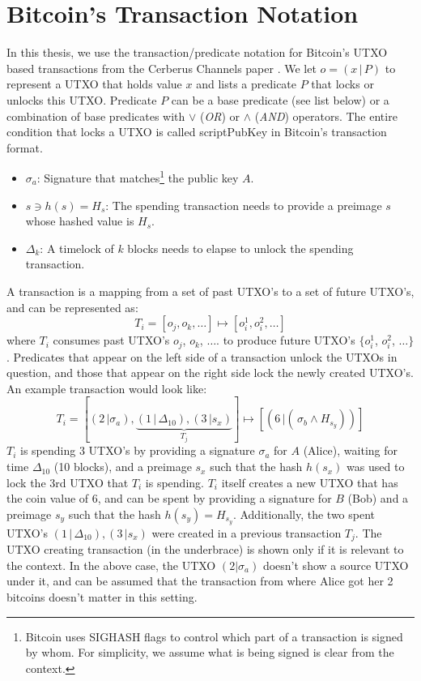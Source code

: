 \section{Bitcoin's Transaction Notation}
In this thesis, we use the transaction/predicate notation for Bitcoin's UTXO based transactions from the Cerberus Channels paper \cite{cerberus}. We let $o = (x\,|\,P)$ to represent a UTXO that holds value $x$ and lists a predicate $P$ that locks or unlocks this UTXO. Predicate $P$ can be a base predicate (see list below) or a combination of base predicates with $\lor$ (\textit{OR}) or $\land$ (\textit{AND}) operators. The entire condition that locks a UTXO is called scriptPubKey in Bitcoin's transaction format.
\begin{itemize}
    \item $\sigma_a$: Signature that matches\footnote{Bitcoin uses SIGHASH flags to control which part of a transaction is signed by whom. For simplicity, we assume what is being signed is clear from the context.} the public key $A$.
    \item $s \ni h(s) = H_s$: The spending transaction needs to provide a preimage $s$ whose hashed value is $H_s$.
    \item $\Delta_k$: A timelock of $k$ blocks needs to elapse to unlock the spending transaction.
\end{itemize}
A transaction is a mapping from a set of past UTXO's to a set of future UTXO's, and can be represented as:
$$T_i = [o_j, o_k, \ldots] \mapsto [o_i^1, o_i^2, \ldots]$$
where $T_i$ consumes past UTXO's $o_j$, $o_k$, $\ldots$. to produce future UTXO's $\{o_i^1$, $o_i^2$, $\ldots\}$. Predicates that appear on the left side of a transaction unlock the UTXOs in question, and those that appear on the right side lock the newly created UTXO's. An example transaction would look like:
$$T_i = [(2\,|\sigma_a), \underbrace{(1\,|\,\Delta_{10}), (3\,|s_x)}_{T_j}] \mapsto [(6\,|(\,\sigma_b \land H_{s_y}))]$$
$T_i$ is spending 3 UTXO's by providing a signature $\sigma_a$ for $A$ (Alice), waiting for time $\Delta_{10}$ (10 blocks), and a preimage $s_x$ such that the hash $h(s_x)$ was used to lock the 3rd UTXO that $T_i$ is spending. $T_i$ itself creates a new UTXO that has the coin value of 6, and can be spent by providing a signature for $B$ (Bob) and a preimage $s_y$ such that the hash $h(s_y) = H_{s_y}$. Additionally, the two spent UTXO's $(1\,|\,\Delta_{10}), (3\,|s_x)$ were created in a previous transaction $T_j$. The UTXO creating transaction (in the underbrace) is shown only if it is relevant to the context. In the above case, the UTXO $(2|\sigma_a)$ doesn't show a source UTXO under it, and can be assumed that the transaction from where Alice got her 2 bitcoins doesn't matter in this setting. 


